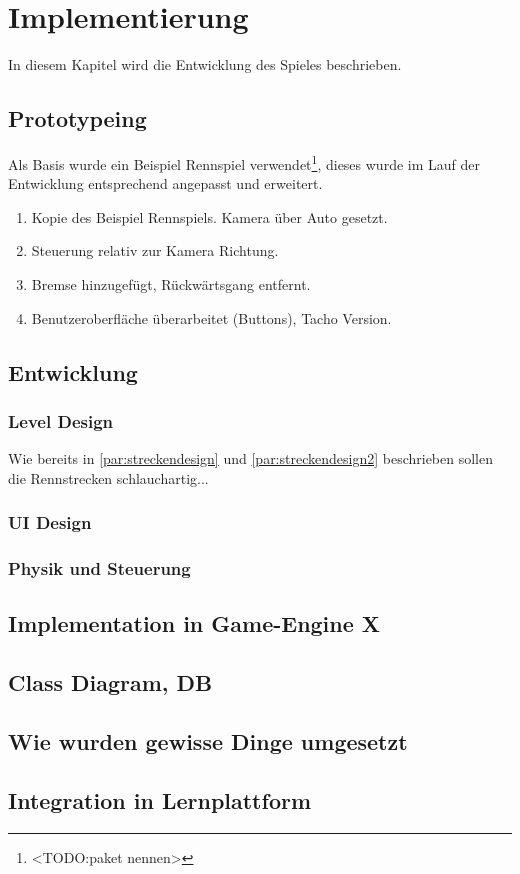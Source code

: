 \section{Implementierung}\label{sec:impl}
In diesem Kapitel wird die Entwicklung des Spieles beschrieben.
\subsection{Prototypeing}
	Als Basis wurde ein Beispiel Rennspiel verwendet\footnote{<TODO:paket nennen>}, dieses wurde im Lauf der Entwicklung entsprechend angepasst und erweitert.
	\begin{enumerate}[label=Prototyp \arabic*]
		\item{ Kopie des Beispiel Rennspiels. Kamera über Auto gesetzt. }
		\item{ Steuerung relativ zur Kamera Richtung. }
		\item{ Bremse hinzugefügt, Rückwärtsgang entfernt. }
		\item{ Benutzeroberfläche überarbeitet (Buttons), Tacho Version. }
	\end{enumerate}
\subsection{Entwicklung}
	\subsubsection{Level Design}
		Wie bereits in \ref{par:streckendesign} und \ref{par:streckendesign2} beschrieben sollen die Rennstrecken schlauchartig...
	\subsubsection{UI Design}
	\subsubsection{Physik und Steuerung}
	\subsubsection{}
\subsection{Implementation in Game-Engine X}
\subsection{Class Diagram, DB}
\subsection{Wie wurden gewisse Dinge umgesetzt}
\subsection{Integration in Lernplattform}
